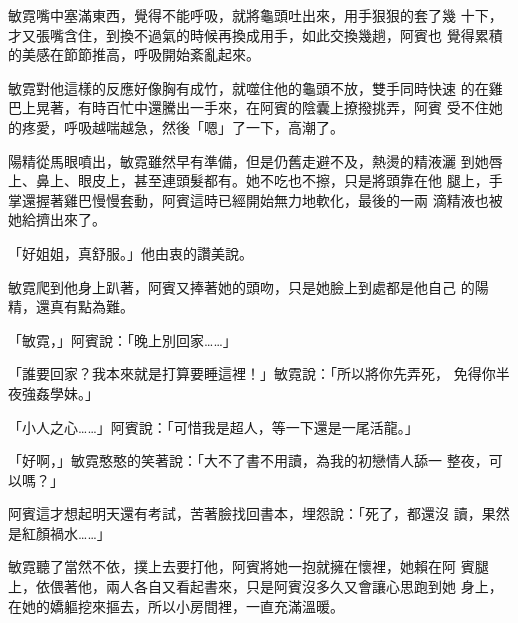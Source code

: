 敏霓嘴中塞滿東西，覺得不能呼吸，就將龜頭吐出來，用手狠狠的套了幾
十下，才又張嘴含住，到換不過氣的時候再換成用手，如此交換幾趟，阿賓也
覺得累積的美感在節節推高，呼吸開始紊亂起來。

敏霓對他這樣的反應好像胸有成竹，就噬住他的龜頭不放，雙手同時快速
的在雞巴上晃著，有時百忙中還騰出一手來，在阿賓的陰囊上撩撥挑弄，阿賓
受不住她的疼愛，呼吸越喘越急，然後「嗯」了一下，高潮了。

陽精從馬眼噴出，敏霓雖然早有準備，但是仍舊走避不及，熱燙的精液灑
到她唇上、鼻上、眼皮上，甚至連頭髮都有。她不吃也不擦，只是將頭靠在他
腿上，手掌還握著雞巴慢慢套動，阿賓這時已經開始無力地軟化，最後的一兩
滴精液也被她給擠出來了。

「好姐姐，真舒服。」他由衷的讚美說。

敏霓爬到他身上趴著，阿賓又捧著她的頭吻，只是她臉上到處都是他自己
的陽精，還真有點為難。

「敏霓，」阿賓說：「晚上別回家……」

「誰要回家？我本來就是打算要睡這裡！」敏霓說：「所以將你先弄死，
免得你半夜強姦學妹。」

「小人之心……」阿賓說：「可惜我是超人，等一下還是一尾活龍。」

「好啊，」敏霓憨憨的笑著說：「大不了書不用讀，為我的初戀情人舔一
整夜，可以嗎？」

阿賓這才想起明天還有考試，苦著臉找回書本，埋怨說：「死了，都還沒
讀，果然是紅顏禍水……」

敏霓聽了當然不依，撲上去要打他，阿賓將她一抱就擁在懷裡，她賴在阿
賓腿上，依偎著他，兩人各自又看起書來，只是阿賓沒多久又會讓心思跑到她
身上，在她的嬌軀挖來摳去，所以小房間裡，一直充滿溫暖。










